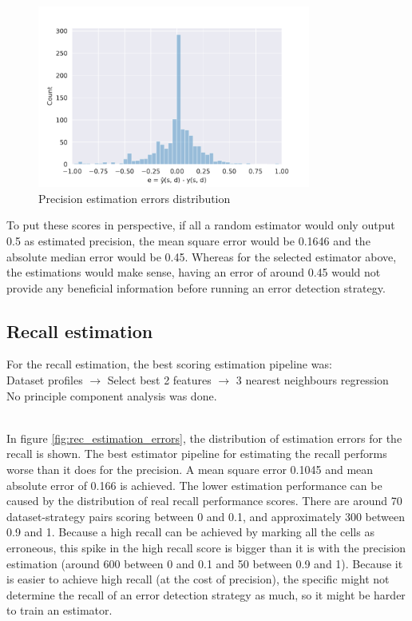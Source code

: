 \begin{figure}
    \centering
    \includegraphics[width=0.8\textwidth]{thesis/Figures/RQ2/15_error_histogramcell_prec.pdf}
    \caption{Precision estimation errors distribution}
    \label{fig:prec_estimation_errors}
\end{figure}

To put these scores in perspective, if all a random estimator would only output 0.5 as estimated precision, the mean square error would be 0.1646 and the absolute median error would be 0.45. Whereas for the selected estimator above, the estimations would make sense, having an error of around 0.45 would not provide any beneficial information before running an error detection strategy. 

\subsection{Recall estimation}
For the recall estimation, the best scoring estimation pipeline was:
~\\Dataset profiles $\rightarrow$ Select best 2 features $\rightarrow$ 3 nearest neighbours regression
\\No principle component analysis was done. 

~\\In figure \ref{fig:rec_estimation_errors}, the distribution of estimation errors for the recall is shown. The best estimator pipeline for estimating the recall performs worse than it does for the precision. A mean square error 0.1045 and mean absolute error of 0.166 is achieved. The lower estimation performance can be caused by the distribution of real recall performance scores. There are around 70 dataset-strategy pairs scoring between 0 and 0.1, and approximately 300 between 0.9 and 1. Because a high recall can be achieved by marking all the cells as erroneous, this spike in the high recall score is bigger than it is with the precision estimation (around 600 between 0 and 0.1 and 50 between 0.9 and 1). Because it is easier to achieve high recall (at the cost of precision), the specific might not determine the recall of an error detection strategy as much, so it might be harder to train an estimator.

